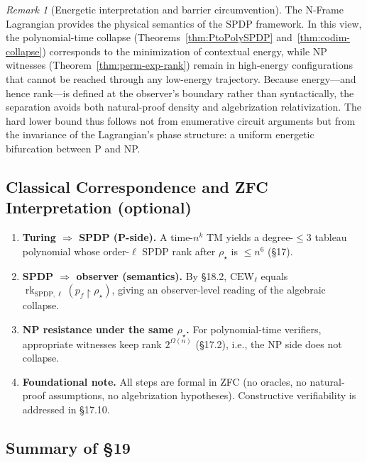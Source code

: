 \documentclass[12pt]{article}
\theoremstyle{definition}
\theoremstyle{definition}
\theoremstyle{remark}
\newtheorem{remark}{Remark}
\theoremstyle{remark}
\begin{document}
\begin{remark}[Energetic interpretation and barrier circumvention]
The N-Frame Lagrangian provides the physical semantics of the SPDP framework. In this view, the polynomial-time collapse (Theorems~\ref{thm:PtoPolySPDP} and~\ref{thm:codim-collapse}) corresponds to the minimization of contextual energy, while NP witnesses (Theorem~\ref{thm:perm-exp-rank}) remain in high-energy configurations that cannot be reached through any low-energy trajectory. Because energy---and hence rank---is defined at the observer's boundary rather than syntactically, the separation avoids both natural-proof density and algebrization relativization. The hard lower bound thus follows not from enumerative circuit arguments but from the invariance of the Lagrangian's phase structure: a uniform energetic bifurcation between P and NP.
\end{remark}

\subsection{Classical Correspondence and ZFC Interpretation (optional)}

\begin{enumerate}
\item \textbf{Turing $\Rightarrow$ SPDP (P-side).} A time-$n^k$ TM yields a degree-$\le 3$ tableau polynomial whose order-$\ell$ SPDP rank after $\rho_\star$ is $\le n^6$ (\S17).

\item \textbf{SPDP $\Rightarrow$ observer (semantics).} By \S18.2, $\mathrm{CEW}_\ell$ equals $\operatorname{rk}_{\mathrm{SPDP},\ell}(p_f\!\upharpoonright\rho_\star)$, giving an observer-level reading of the algebraic collapse.

\item \textbf{NP resistance under the same $\rho_\star$.} For polynomial-time verifiers, appropriate witnesses keep rank $2^{\Omega(n)}$ (\S17.2), i.e., the NP side does not collapse.

\item \textbf{Foundational note.} All steps are formal in ZFC (no oracles, no natural-proof assumptions, no algebrization hypotheses). Constructive verifiability is addressed in \S17.10.
\end{enumerate}

\subsection*{Summary of \S19}
\end{document}
